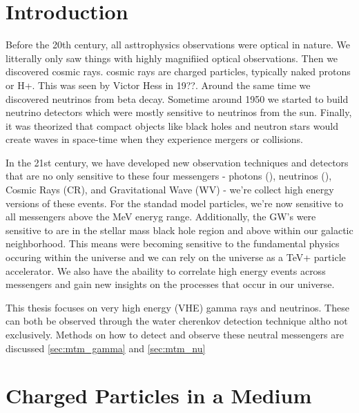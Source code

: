 \section{Introduction\label{sec:chap3_intro}}

Before the 20th century, all asttrophysics observations were optical in nature.
We litterally only saw things with highly magnifiied optical observations.
Then we discovered cosmic rays.
cosmic rays are charged particles, typically naked protons or H+.
This was seen by Victor Hess in 19??.
Around the same time we discovered neutrinos from beta decay.
Sometime around 1950 we started to build neutrino detectors which were mostly sensitive to neutrinos from the sun.
Finally, it was theorized that compact objects like black holes and neutron stars would create waves in space-time when they experience mergers or collisions.

In the 21st century, we have developed new observation techniques and detectors that are no only sensitive to these four messengers - photons (), neutrinos (), Cosmic Rays (CR), and Gravitational Wave (WV) - we're collect high energy versions of these events.
For the standad model particles, we're now sensitive to all messengers above the MeV eneryg range.
Additionally, the GW's were sensitive to are in the stellar mass black hole region and above within our galactic neighborhood.
This means were becoming sensitive to the fundamental physics occuring within the universe and we can rely on the universe as a TeV+ particle accelerator.
We also have the abaility to correlate high energy events across messengers and gain new insights on the processes that occur in our universe.

This thesis focuses on very high energy (VHE) gamma rays and neutrinos.
These can both be observed through the water cherenkov detection technique altho not exclusively.
Methods on how to detect and observe these neutral messengers are discussed \cref{sec:mtm_gamma} and \cref{sec:mtm_nu}

\section{Charged Particles in a Medium\label{sec:cherenkov}}

